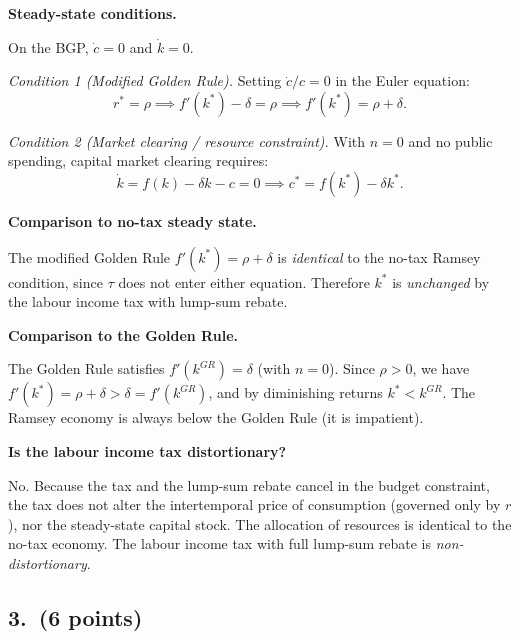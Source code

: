 \documentclass[a4paper,11pt]{article}
\begin{document}
\begin{answerbox}
\textbf{Steady-state conditions.}

On the BGP, $\dot{c} = 0$ and $\dot{k} = 0$.

\textit{Condition 1 (Modified Golden Rule).} Setting $\dot{c}/c = 0$ in the Euler equation:
\[
    r^* = \rho \implies f'(k^*) - \delta = \rho \implies
    \boxed{f'(k^*) = \rho + \delta.}
\]

\textit{Condition 2 (Market clearing / resource constraint).} With $n = 0$ and no public
spending, capital market clearing requires:
\[
    \dot{k} = f(k) - \delta k - c = 0 \implies \boxed{c^* = f(k^*) - \delta k^*.}
\]

\textbf{Comparison to no-tax steady state.}

The modified Golden Rule $f'(k^*) = \rho + \delta$ is \emph{identical} to the no-tax
Ramsey condition, since $\tau$ does not enter either equation. Therefore $k^*$ is
\emph{unchanged} by the labour income tax with lump-sum rebate.

\textbf{Comparison to the Golden Rule.}

The Golden Rule satisfies $f'(k^{GR}) = \delta$ (with $n=0$). Since $\rho > 0$, we have
$f'(k^*) = \rho + \delta > \delta = f'(k^{GR})$, and by diminishing returns
$k^* < k^{GR}$. The Ramsey economy is always below the Golden Rule (it is impatient).

\textbf{Is the labour income tax distortionary?}

No. Because the tax and the lump-sum rebate cancel in the budget constraint, the tax does
not alter the intertemporal price of consumption (governed only by $r$), nor the
steady-state capital stock. The allocation of resources is identical to the no-tax economy.
The labour income tax with full lump-sum rebate is \emph{non-distortionary}.
\end{answerbox}

\subsection*{3.\ (6 points)}
\end{document}
